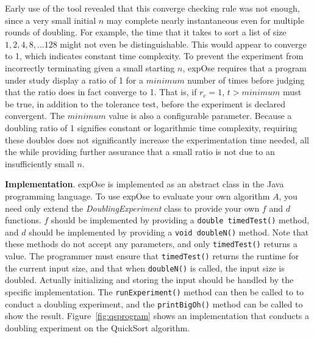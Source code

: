 \documentclass[10pt,twocolumn]{article}
\newcommand{\toolname}{{\sc expOse}\xspace}
\begin{document}
  Early use of the tool revealed that this converge checking rule was
  not enough, since a very small initial $n$ may complete nearly
  instantaneous even for multiple rounds of doubling.  For example, the
  time that it takes to sort a list of size $1, 2, 4, 8, \dots 128$
  might not even be distinguishable. This would appear to converge to 1, which 
  indicates constant time complexity. To prevent the experiment from incorrectly terminating
  given a small starting $n$, \toolname requires that a program under study display a ratio of 1 for a
  $\mathit{minimum}$ number of times before judging that the ratio does in fact converge to 1.  That is, if $r_c = 1$,
  $t > \mathit{minimum}$ must be true, in addition to the tolerance test, before the experiment is declared convergent.
  The $\mathit{minimum}$ value is also a configurable parameter.  Because a doubling ratio of 1 signifies
  constant or logarithmic time complexity, requiring these doubles does not significantly increase the experimentation
  time needed, all the while providing further assurance that a small ratio is not due to an insufficiently small $n$.

    {\bf Implementation}.
    \toolname is implemented as an abstract class in the Java
    programming language.  To use \toolname to evaluate your own
    algorithm $A$, you need only extend the \textit{DoublingExperiment}
    class to provide your own $f$ and $d$ functions.  $f$ should be
    implemented by providing a \texttt{double timedTest()} method,
    and $d$ should be implemented by providing a \texttt{void doubleN()}
    method. Note that these methods do not accept any parameters,
    and only \texttt{timedTest()} returns a value. The programmer
    must ensure that \texttt{timedTest()} returns the runtime for the
    current input size, and that when \texttt{doubleN()} is called,
    the input size is doubled.  Actually initializing and storing the
    input should be handled by the specific implementation. The
    \texttt{runExperiment()} method can then be called to to conduct
    a doubling experiment, and the \texttt{printBigOh()} method can
    be called to show the result. Figure~\ref{fig:qsprogram} shows an
    implementation that conducts a doubling experiment on the QuickSort
    algorithm.

\end{document}
